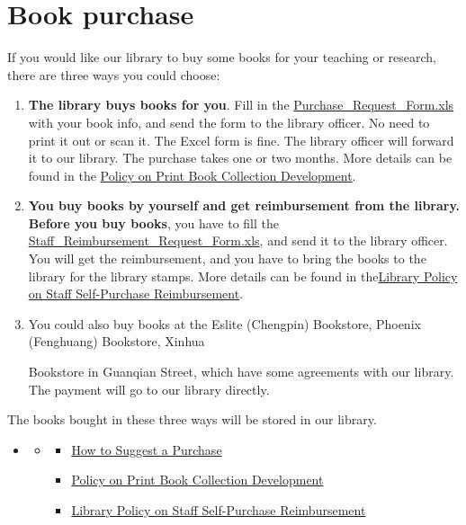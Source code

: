 \documentclass[
]{book}
\providecommand{\tightlist}{%
  \setlength{\itemsep}{0pt}\setlength{\parskip}{0pt}}
\newenvironment{rmdblock}[1]
  {\begin{shaded*}
  \begin{itemize}
  \renewcommand{\labelitemi}{
    \raisebox{-.7\height}[0pt][0pt]{
      {\setkeys{Gin}{width=2em,keepaspectratio}\texttt{[image: image/\#1]}}
    }
  }
  \item
  }
  {
  \end{itemize}
  \end{shaded*}
  }
\newenvironment{rmdrd}
  {\begin{rmdblock}{rd}}
  {\end{rmdblock}}
\begin{document}
\hypertarget{book-purchase}{%
\section{Book purchase}\label{book-purchase}}

If you would like our library to buy some books for your teaching or research, there are three ways you could choose:

\begin{enumerate}
\def\labelenumi{\arabic{enumi}.}
\item
  \textbf{The library buys books for you}. Fill in the \href{http://libguides.lib.xjtlu.edu.cn/ld.php?content_id=15552390}{Purchase\_Request\_Form.xls} with your book info, and send the form to the library officer. No need to print it out or scan it. The Excel form is fine. The library officer will forward it to our library. The purchase takes one or two months. More details can be found in the \href{http://libguides.lib.xjtlu.edu.cn/ld.php?content_id=15552051}{Policy on Print Book Collection Development}.
\item
  \textbf{You buy books by yourself and get reimbursement from the library.} \textbf{Before you buy books}, you have to fill the \href{https://libguides.lib.xjtlu.edu.cn/ld.php?content_id=47964273}{Staff\_Reimbursement\_Request\_Form.xls}, and send it to the library officer. You will get the reimbursement, and you have to bring the books to the library for the library stamps. More details can be found in the\href{http://libguides.lib.xjtlu.edu.cn/ld.php?content_id=15552277}{Library Policy on Staff Self-Purchase Reimbursement}.
\item
  You could also buy books at the Eslite (Chengpin) Bookstore, Phoenix (Fenghuang) Bookstore, Xinhua

  Bookstore in Guanqian Street, which have some agreements with our library. The payment will go to our library directly.
\end{enumerate}

The books bought in these three ways will be stored in our library.

\begin{rmdrd}
\begin{rmdrd}

\begin{itemize}
\tightlist
\item
  \href{https://libguides.lib.xjtlu.edu.cn/c.php?g=376964\&p=6685926}{How to Suggest a Purchase}
\item
  \href{http://libguides.lib.xjtlu.edu.cn/ld.php?content_id=15552051}{Policy on Print Book Collection Development}
\item
  \href{http://libguides.lib.xjtlu.edu.cn/ld.php?content_id=15552277}{Library Policy on Staff Self-Purchase Reimbursement}
\end{itemize}

\end{rmdrd}
\end{rmdrd}
\end{document}
